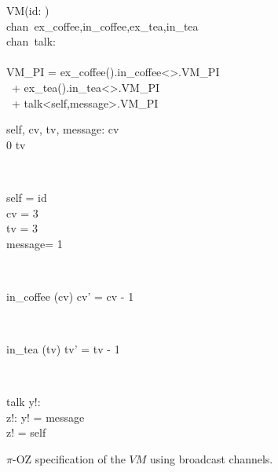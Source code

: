 \begin{figure}[H]
\centering
\begin{class}{VM(id: \integer)}
\ 
\\chan\ ex\_coffee,in\_coffee,ex\_tea,in\_tea
\ 
\\chan\ talk:\integer \times \integer
\ \\ \
\\VM\_PI = ex\_coffee().in\_coffee<>.VM\_PI 
\\ \ \qquad \qquad + ex\_tea().in\_tea<>.VM\_PI 
\\ \ \qquad \qquad + talk<self,message>.VM\_PI
\\
\begin{state}
self, cv, tv, message: \integer
{} \leq  cv 
\\
0 \leq  tv 
\end{state} 
\\
\begin{init}
self = id
\\cv = 3
\\tv = 3
\\ message= 1
\end{init} 
\\
\begin{op}{in\_coffee}
\Delta (cv)
\ST
cv' = cv - 1
\end{op}
\\
\begin{op}{in\_tea}
\Delta (tv)
\ST
tv' = tv - 1
\end{op}
\\
\begin{op}{talk}
y!: \integer
\\z!: \integer
\ST
y! = message
\\z! = self
\end{op}
\end{class}
\caption{$\pi$-OZ specification of the $VM$ using broadcast channels.}
\label{comp_oz_pi_statefull_vm_broadcast}
\end{figure}